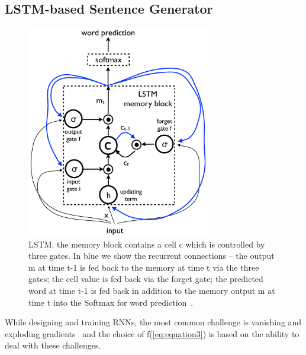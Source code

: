 \documentclass[a4paper,UKenglish,cleveref, autoref, thm-restate]{lipics-v2021}
\begin{document}
\subsection{LSTM-based Sentence Generator}
\begin{figure}[ht]
    \centering
    \includegraphics[width=8cm]{images/softmax lstm.png}
    \caption{ LSTM: the memory block contains a cell c which is controlled by three gates. In blue we show the recurrent connections – the output m at time t-1 is fed back to the memory at time t via the three gates; the cell value is fed back via the forget gate; the predicted word at time t-1 is fed back in addition to the memory output m at time t into the Softmax for word prediction~\cite{NIC}.}
    \label{fig:LSTM}
\end{figure}
While designing and training RNNs, the most common challenge is vanishing and exploding gradients~\cite{10} and the choice of f(\ref{eq:equation3}) is based on the ability to deal with these challenges.
\end{document}

